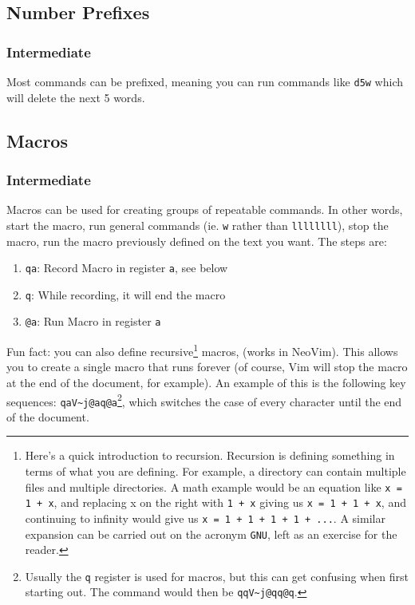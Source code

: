\documentclass[11pt]{article}
\begin{document}
\subsection{Number Prefixes}
\label{sec:org522756e}
\subsubsection{Intermediate}
\label{sec:org0b4a614}
Most commands can be prefixed, meaning you can run commands like \texttt{d5w} which
will delete the next 5 words.
\subsection{Macros}
\label{sec:org7866893}
\subsubsection{Intermediate}
\label{sec:org28bd644}
Macros can be used for creating groups of repeatable commands. In other words,
start the macro, run general commands (ie. \texttt{w} rather than \texttt{llllllll}), stop the
macro, run the macro previously defined on the text you want. The steps are:

\begin{enumerate}
\item \texttt{qa}: Record Macro in register \texttt{a}, see below
\item \texttt{q}: While recording, it will end the macro
\item \texttt{@a}: Run Macro in register \texttt{a}
\end{enumerate}

Fun fact: you can also define recursive\footnote{Here's a quick introduction to recursion. Recursion is defining 
something in terms of what you are defining. For example, a directory 
can contain multiple files and multiple directories. A math example 
would be an equation like \texttt{x = 1 + x}, and replacing x on the right with
\texttt{1 + x} giving us \texttt{x = 1 + 1 + x}, and continuing to infinity would give
us \texttt{x = 1 + 1 + 1 + 1 + ...}. A similar expansion can be carried out 
on the acronym \texttt{GNU}, left as an exercise for the reader.} macros, (works in NeoVim). This
allows you to create a single macro that runs forever (of course, Vim will stop
the macro at the end of the document, for example). An example of this is the
following key sequences: \texttt{qaV\textasciitilde{}j@aq@a}\footnote{Usually the \texttt{q} register is used for macros, but this can get
confusing when first starting out. The command would then be \texttt{qqV\textasciitilde{}j@qq@q}.}, which switches the case of every
character until the end of the document.
\end{document}
